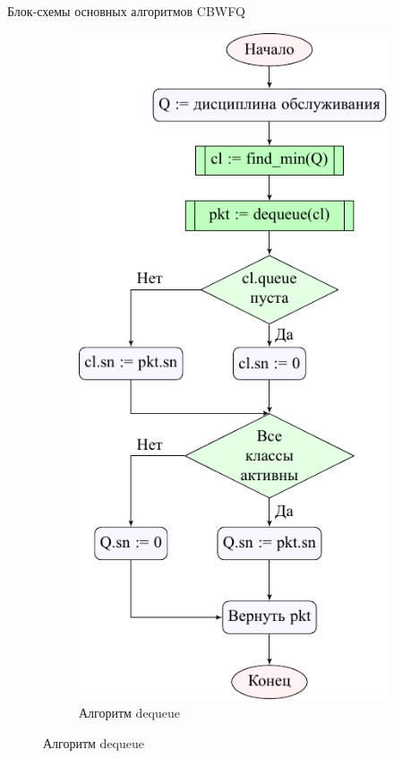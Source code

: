 \documentclass[12pt]{beamer}
\begin{document}
\begin{frame}{Блок-схемы основных алгоритмов CBWFQ}
\begin{figure}
\begin{subfigure}[b]{0.4\textwidth}
            \center%
            \includegraphics[scale=0.5,frame]{../text/pdfimages/deq_algo.pdf}%
    		\caption*{Алгоритм dequeue}
		\end{subfigure}
	\end{figure}	
\end{frame}
\end{document}
